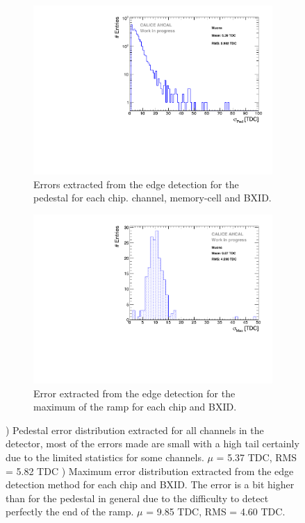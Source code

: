 \begin{figure}[thtbp!]
	\begin{subfigure}[t]{0.45\textwidth}
		\centering
		\includegraphics[width=1\linewidth]{chap5/fig_AHCAL_timing/Muons/PedestalErrorDistribution_AHCAL.pdf}
		\caption{Errors extracted from the edge detection for the pedestal for each chip. channel, memory-cell and BXID.} \label{fig:error_ped}
	\end{subfigure}
	\hfill
	\begin{subfigure}[t]{0.45\textwidth}
		\centering
		\includegraphics[width=1\linewidth]{chap5/fig_AHCAL_timing/Muons/MaxErrorDistribution_AHCAL.pdf}
		\caption{Error extracted from the edge detection for the maximum of the ramp for each chip and BXID.} \label{fig:error_max}
	\end{subfigure}
	\caption{) Pedestal error distribution extracted for all channels in the detector, most of the errors made are small with a high tail certainly due to the limited statistics for some channels. $\mu$ = 5.37 TDC, RMS = 5.82 TDC ) Maximum error distribution extracted from the edge detection method for each chip and BXID. The error is a bit higher than for the pedestal in general due to the difficulty to detect perfectly the end of the ramp. $\mu$ = 9.85 TDC, RMS = 4.60 TDC.}
\end{figure}

